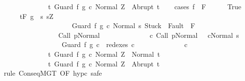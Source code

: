 \begin{isabellebody}
\ \ \ \ \ \ \ \ \ \ \ \ \ \ {\isacharbraceleft}t{\isachardot}\ {\isasymGamma}{\isasymturnstile}{\isasymlangle}Guard\ f\ g\ c\ {\isacharcomma}Normal\ Z{\isasymrangle}\ {\isasymRightarrow}\ Abrupt\ t{\isacharbraceright}{\isachardoublequoteclose}\isanewline
\ \ \isamarkupfalse%
\ {\isacharparenleft}cases\ {\isachardoublequoteopen}f\ {\isasymin}\ F{\isachardoublequoteclose}{\isacharparenright}\isanewline
\ \ \ \ \isamarkupfalse%
\ True\isanewline
\ \ \ \ \isamarkupfalse%
\ {\isachardoublequoteopen}{\isasymGamma}{\isacharcomma}{\isasymTheta}{\isasymturnstile}\isactrlsub t\isactrlbsub {\isacharslash}F\isactrlesub \ {\isacharparenleft}g\ {\isasyminter}\ {\isacharbraceleft}s{\isachardot}\ s{\isacharequal}Z\ {\isasymand}\ \isanewline
\ \ \ \ \ \ \ \ \ \ \ \ \ \ \ \ \ \ \ \ \ {\isasymGamma}{\isasymturnstile}{\isasymlangle}Guard\ f\ g\ c\ {\isacharcomma}Normal\ s{\isasymrangle}\ {\isasymRightarrow}{\isasymnotin}{\isacharparenleft}{\isacharbraceleft}Stuck{\isacharbraceright}\ {\isasymunion}\ Fault\ {\isacharbackquote}\ {\isacharparenleft}{\isacharminus}F{\isacharparenright}{\isacharparenright}\ {\isasymand}\ \isanewline
\ \ \ \ \ \ \ \ \ \ \ \ \ \ \ \ \ {\isasymGamma}{\isasymturnstile}Call\ p{\isasymdown}Normal\ {\isasymsigma}\ {\isasymand}\isanewline
\ \ \ \ \ \ \ \ \ \ \ \ {\isacharparenleft}{\isasymexists}c{\isacharprime}{\isachardot}\ {\isasymGamma}{\isasymturnstile}{\isacharparenleft}Call\ p{\isacharcomma}Normal\ {\isasymsigma}{\isacharparenright}\ {\isasymrightarrow}\isactrlsup {\isacharplus}\ {\isacharparenleft}c{\isacharprime}{\isacharcomma}Normal\ s{\isacharparenright}\ {\isasymand}\isanewline
\ \ \ \ \ \ \ \ \ \ \ \ \ \ \ \ \ \ Guard\ f\ g\ c\ {\isasymin}\ redexes\ c{\isacharprime}{\isacharparenright}{\isacharbraceright}{\isacharparenright}\isanewline
\ \ \ \ \ \ \ \ \ \ \ \ \ \ c\ \ \isanewline
\ \ \ \ \ \ \ \ \ \ \ \ \ \ {\isacharbraceleft}t{\isachardot}\ {\isasymGamma}{\isasymturnstile}{\isasymlangle}Guard\ f\ g\ c\ {\isacharcomma}Normal\ Z{\isasymrangle}\ {\isasymRightarrow}\ Normal\ t{\isacharbraceright}{\isacharcomma}\isanewline
\ \ \ \ \ \ \ \ \ \ \ \ \ \ {\isacharbraceleft}t{\isachardot}\ {\isasymGamma}{\isasymturnstile}{\isasymlangle}Guard\ f\ g\ c\ {\isacharcomma}Normal\ Z{\isasymrangle}\ {\isasymRightarrow}\ Abrupt\ t{\isacharbraceright}{\isachardoublequoteclose}\isanewline
\ \ \ \ \isamarkupfalse%
\ {\isacharparenleft}rule\ ConseqMGT\ {\isacharbrackleft}OF\ hyp{\isacharunderscore}c{\isacharbrackright}{\isacharcomma}\ safe{\isacharparenright}\isanewline
\ \ \ \ \ \ \isamarkupfalse%

\end{isabellebody}
